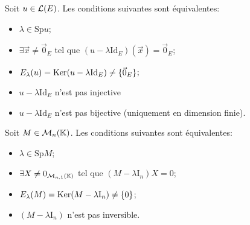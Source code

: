 \documentclass[a4paper]{book}
\begin{document}
\begin{Proposition}
Soit $u\in \mathcal{L}(E)$. Les conditions suivantes sont équivalentes:
\begin{itemize}
\item $\lambda    \in \mathrm{Sp} u$;
\item $\exists \vec{x}\neq  \vec{0}_{E}$ tel que $(u -\lambda    \mathrm{Id}_E)(\vec{x}) = \vec{0}_E$;
\item $E_\lambda    (u) = \operatorname{Ker}(u -\lambda    \mathrm{Id}_E)\neq \{ \vec{0}_{E}\}$;
\item $u -\lambda    \mathrm{Id}_E$ n'est pas injective
\item $u -\lambda    \mathrm{Id}_E$ n'est pas bijective (uniquement en dimension finie).
\end{itemize}
\end{Proposition}
\begin{Proposition}
Soit $M\in \mathcal{M}_{n}(\mathbb{K})$. Les conditions suivantes sont équivalentes:
\begin{itemize}
\item $\lambda    \in \mathrm{Sp} M$;
\item $\exists X\neq 0_{\mathcal{M}_{n,1}(\mathbb{K})}$ tel que $(M -\lambda    \mathrm{I}_n)X = 0$;
\item $E_\lambda    (M) = \operatorname{Ker}(M -\lambda    \mathrm{I}_n)\neq\{0\}$;
\item $(M -\lambda    \mathrm{I}_n)$ n'est pas inversible.
\end{itemize}
\end{Proposition}
\end{document}
